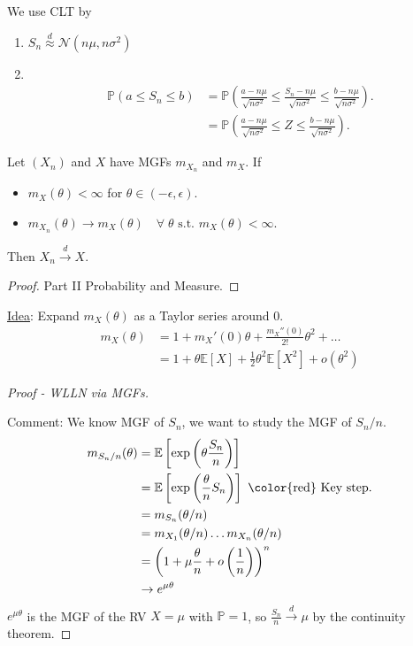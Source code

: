 We use CLT by 
\begin{enumerate}
    \item $S_n \overset{d}{\approx} \mathcal{N}(n \mu, n \sigma^2)$
    \item ~\vspace*{-1.5\baselineskip} 
    \begin{align*}
        \mathbb{P}(a \leq S_n \leq b) &= \mathbb{P}\left( \frac{a - n \mu}{\sqrt{n \sigma^2}} \leq \frac{S_n - n \mu}{\sqrt{n \sigma^2}} \leq \frac{b - n \mu}{\sqrt{n \sigma^2}} \right). \\
        &= \mathbb{P} \left( \frac{a - n \mu}{\sqrt{n \sigma^2}} \leq Z \leq \frac{b - n \mu}{\sqrt{n \sigma^2}} \right).
    \end{align*} 
\end{enumerate} 

\begin{theorem}
    Let $(X_n)$ and $X$ have MGFs $m_{X_n}$ and $m_X$.
    If \begin{itemize}
        \item $m_X(\theta) < \infty$ for $\theta \in (-\epsilon, \epsilon)$.
        \item $m_{X_n}(\theta) \to m_X(\theta) \quad \forall \; \theta \text{ s.t. } m_X(\theta) < \infty$.
    \end{itemize} 
    Then $X_n \overset{d}{\to} X$.
\end{theorem} 

\begin{proof}
    Part II Probability and Measure.
\end{proof} 

\underline{Idea}: Expand $m_X(\theta)$ as a Taylor series around $0$.
\begin{align*}
    m_X(\theta) &= 1 + m_X'(0) \theta + \frac{m_X''(0)}{2!} \theta^2 + \dots \\
    &= 1 + \theta \mathbb{E}[X] + \frac{1}{2} \theta^2 \mathbb{E}[X^2] + o(\theta^2)
\end{align*} 

\begin{proof}[Proof - WLLN via MGFs] ~

    Comment: We know MGF of $S_n$, we want to study the MGF of $S_n / n$.
    \begin{align*}
        m_{S_n / n}(\theta) &= \mathbb{E}\left[\exp \left( \theta \frac{S_n}{n} \right) \right] \\
        &= \mathbb{E}\left[\exp \left( \frac{\theta}{n} S_n \right) \right] \ \text{\color{red} Key step}. \\
        &= m_{S_n}(\theta / n) \\
        &= m_{X_1}(\theta / n) \dots m_{X_n}(\theta / n) \\
        &= \left( 1 + \mu \frac{\theta}{n} + o \left( \frac{1}{n} \right) \right)^n \\
        &\to e^{\mu \theta}
    \end{align*} 
    $e^{\mu \theta}$ is the MGF of the RV $X = \mu$ with $\mathbb{P} = 1$, so $\frac{S_n}{n} \overset{d}{\to} \mu$ by the continuity theorem.
\end{proof} 

